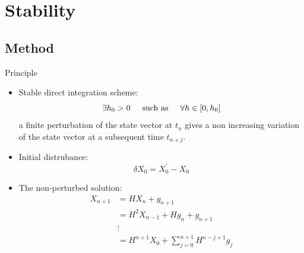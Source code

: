 \section{Stability}
\subsection{Method}
\begin{frame}{Principle}
\begin{itemize}
\item Stable direct integration scheme:
\begin{equation*}
\exists h_0 > 0 \hspace{0.5cm}\text{such as} \hspace{0.5cm} \forall h \in [0,h_0]
\end{equation*}  
a finite perturbation of the state vector at $t_n$ gives a non increasing variation of the state vector at a subsequent time $t_{n+j}$.
\item Initial distrubance:
\begin{equation}
\delta X_0 = X_0^\prime - X_0
\end{equation}
\item The non-perturbed solution:
\begin{align}
X_{n+1} &= H X_n + g_{n+1} \\
&= H^2 X_{n-1} + Hg_n + g_{n+1} \\
&\vdots\\
&= H^{n+1}X_0 + \sum^{n+1}_{j=0} H^{n-j+1}g_j
\end{align}
\end{itemize}
\end{frame}

